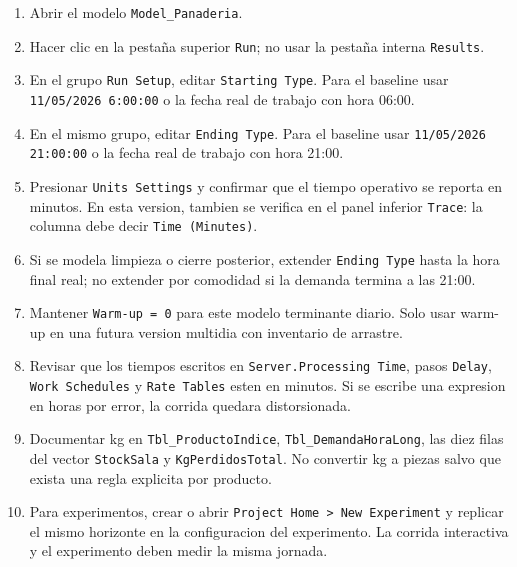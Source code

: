 \documentclass[11pt]{article}
\newcommand{\simio}[1]{\texttt{#1}}
\newcommand{\tabla}[1]{\texttt{#1}}
\newcommand{\state}[1]{\texttt{#1}}
\newcommand{\resp}[1]{\texttt{#1}}
\begin{document}
\begin{enumerate}
  \item Abrir el modelo \simio{Model\_Panaderia}.
  \item Hacer clic en la pestaña superior \simio{Run}; no usar la pestaña interna \simio{Results}.
  \item En el grupo \simio{Run Setup}, editar \simio{Starting Type}. Para el baseline usar \simio{11/05/2026 6:00:00} o la fecha real de trabajo con hora 06:00.
  \item En el mismo grupo, editar \simio{Ending Type}. Para el baseline usar \simio{11/05/2026 21:00:00} o la fecha real de trabajo con hora 21:00.
  \item Presionar \simio{Units Settings} y confirmar que el tiempo operativo se reporta en minutos. En esta version, tambien se verifica en el panel inferior \simio{Trace}: la columna debe decir \simio{Time (Minutes)}.
  \item Si se modela limpieza o cierre posterior, extender \simio{Ending Type} hasta la hora final real; no extender por comodidad si la demanda termina a las 21:00.
  \item Mantener \simio{Warm-up = 0} para este modelo terminante diario. Solo usar warm-up en una futura version multidia con inventario de arrastre.
  \item Revisar que los tiempos escritos en \simio{Server.Processing Time}, pasos \simio{Delay}, \simio{Work Schedules} y \simio{Rate Tables} esten en minutos. Si se escribe una expresion en horas por error, la corrida quedara distorsionada.
  \item Documentar kg en \tabla{Tbl\_ProductoIndice}, \tabla{Tbl\_DemandaHoraLong}, las diez filas del vector \state{StockSala} y \resp{KgPerdidosTotal}. No convertir kg a piezas salvo que exista una regla explicita por producto.
  \item Para experimentos, crear o abrir \simio{Project Home > New Experiment} y replicar el mismo horizonte en la configuracion del experimento. La corrida interactiva y el experimento deben medir la misma jornada.
\end{enumerate}
\end{document}
